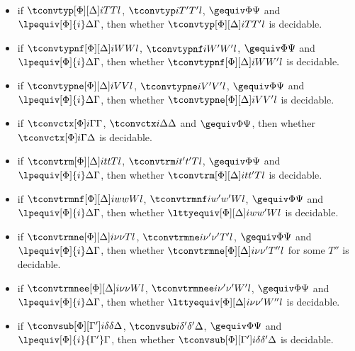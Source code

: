 \begin{lemma}[Decidability] $ $
  \begin{itemize}
  \item if $\tconvtyp[\Phi][\Delta] i T{T} l$, $\tconvtyp i {T'}{T'} l$,
    $\gequiv\Phi\Psi$ and $\lpequiv[\Phi]{i}\Delta\Gamma$, then whether
    $\tconvtyp[\Phi][\Delta] i T{T'} l$ is decidable.
  \item if $\tconvtypnf[\Phi][\Delta] i W{W} l$, $\tconvtypnf i{W'}{W'} l$,
    $\gequiv\Phi\Psi$ and $\lpequiv[\Phi]{i}\Delta\Gamma$, then whether
    $\tconvtypnf[\Phi][\Delta] i W{W'} l$ is decidable.
  \item if $\tconvtypne[\Phi][\Delta] i V{V}l$, $\tconvtypne i {V'}{V'}l$,
    $\gequiv\Phi\Psi$ and $\lpequiv[\Phi]{i}\Delta\Gamma$, then whether
    $\tconvtypne[\Phi][\Delta] i V{V'}l$ is decidable. %
  \item if $\tconvctx[\Phi] i \Gamma \Gamma$, $\tconvctx i \Delta \Delta$ and
    $\gequiv\Phi\Psi$, then whether $\tconvctx[\Phi] i \Gamma \Delta$ is decidable. 
  \item if $\tconvtrm[\Phi][\Delta] i t{t}T l$, $\tconvtrm i{t'}{t'}{T} l$,
    $\gequiv\Phi\Psi$ and $\lpequiv[\Phi]{i}\Delta\Gamma$, then whether
    $\tconvtrm[\Phi][\Delta] i t{t'}{T} l$ is decidable.
  \item if $\tconvtrmnf[\Phi][\Delta] i w{w}W l$, $\tconvtrmnf i {w'}{w'}{W} l$,
    $\gequiv\Phi\Psi$ and $\lpequiv[\Phi]{i}\Delta\Gamma$, then whether
    $\lttyequiv[\Phi][\Delta] i w{w'}{W} l$ is decidable.
  \item if $\tconvtrmne[\Phi][\Delta] i \nu{\nu}T l$,
    $\tconvtrmne i {\nu'}{\nu'}{T'} l$, $\gequiv\Phi\Psi$ and
    $\lpequiv[\Phi]{i}\Delta\Gamma$, then whether
    $\tconvtrmne[\Phi][\Delta] i \nu{\nu'}{T''} l$ for some $T''$ is decidable.
  \item if $\tconvtrmnee[\Phi][\Delta] i \nu{\nu}W l$,
    $\tconvtrmnee i {\nu'}{\nu'}{W'} l$, $\gequiv\Phi\Psi$ and
    $\lpequiv[\Phi]{i}\Delta\Gamma$, then whether
    $\lttyequiv[\Phi][\Delta] i \nu{\nu'}{W''} l$ is decidable.
  \item if $\tconvsub[\Phi][\Gamma'] i{\delta}{\delta}{\Delta}$,
    $\tconvsub i{\delta'}{\delta'}{\Delta}$, $\gequiv\Phi\Psi$ and
    $\lpequiv[\Phi]{i}{\Gamma'}\Gamma$, then whether
    $\tconvsub[\Phi][\Gamma'] i{\delta}{\delta'}{\Delta}$ is decidable. %
  \end{itemize}
\end{lemma}
